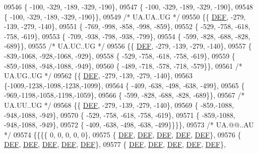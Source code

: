 \begin{DoxyCode}
09546 \{ -100, -329, -189, -329, -190\},
09547 \{ -100, -329, -189, -329, -190\},
09548 \{ -100, -329, -189, -329, -190\}\},
09549 \textcolor{comment}{/* UA.UA..UG */}
09550 \{\{  \mbox{\hyperlink{1_88_84__epars_8h_a397419fc12b37ed479c8abb9d444d843}{DEF}}, -279, -139, -279, -140\},
09551 \{ -769, -998, -858, -998, -859\},
09552 \{ -529, -758, -618, -758, -619\},
09553 \{ -709, -938, -798, -938, -799\},
09554 \{ -599, -828, -688, -828, -689\}\},
09555 \textcolor{comment}{/* UA.UC..UG */}
09556 \{\{  \mbox{\hyperlink{1_88_84__epars_8h_a397419fc12b37ed479c8abb9d444d843}{DEF}}, -279, -139, -279, -140\},
09557 \{ -839,-1068, -928,-1068, -929\},
09558 \{ -529, -758, -618, -758, -619\},
09559 \{ -859,-1088, -948,-1088, -949\},
09560 \{ -489, -718, -578, -718, -579\}\},
09561 \textcolor{comment}{/* UA.UG..UG */}
09562 \{\{  \mbox{\hyperlink{1_88_84__epars_8h_a397419fc12b37ed479c8abb9d444d843}{DEF}}, -279, -139, -279, -140\},
09563 \{-1009,-1238,-1098,-1238,-1099\},
09564 \{ -409, -638, -498, -638, -499\},
09565 \{ -969,-1198,-1058,-1198,-1059\},
09566 \{ -599, -828, -688, -828, -689\}\},
09567 \textcolor{comment}{/* UA.UU..UG */}
09568 \{\{  \mbox{\hyperlink{1_88_84__epars_8h_a397419fc12b37ed479c8abb9d444d843}{DEF}}, -279, -139, -279, -140\},
09569 \{ -859,-1088, -948,-1088, -949\},
09570 \{ -529, -758, -618, -758, -619\},
09571 \{ -859,-1088, -948,-1088, -949\},
09572 \{ -409, -638, -498, -638, -499\}\}\}\},
09573 \textcolor{comment}{/* UA.@@..AU */}
09574 \{\{\{\{    0,    0,    0,    0,    0\},
09575 \{  \mbox{\hyperlink{1_88_84__epars_8h_a397419fc12b37ed479c8abb9d444d843}{DEF}},  \mbox{\hyperlink{1_88_84__epars_8h_a397419fc12b37ed479c8abb9d444d843}{DEF}},  \mbox{\hyperlink{1_88_84__epars_8h_a397419fc12b37ed479c8abb9d444d843}{DEF}},  \mbox{\hyperlink{1_88_84__epars_8h_a397419fc12b37ed479c8abb9d444d843}{DEF}},  \mbox{\hyperlink{1_88_84__epars_8h_a397419fc12b37ed479c8abb9d444d843}{DEF}}\},
09576 \{  \mbox{\hyperlink{1_88_84__epars_8h_a397419fc12b37ed479c8abb9d444d843}{DEF}},  \mbox{\hyperlink{1_88_84__epars_8h_a397419fc12b37ed479c8abb9d444d843}{DEF}},  \mbox{\hyperlink{1_88_84__epars_8h_a397419fc12b37ed479c8abb9d444d843}{DEF}},  \mbox{\hyperlink{1_88_84__epars_8h_a397419fc12b37ed479c8abb9d444d843}{DEF}},  \mbox{\hyperlink{1_88_84__epars_8h_a397419fc12b37ed479c8abb9d444d843}{DEF}}\},
09577 \{  \mbox{\hyperlink{1_88_84__epars_8h_a397419fc12b37ed479c8abb9d444d843}{DEF}},  \mbox{\hyperlink{1_88_84__epars_8h_a397419fc12b37ed479c8abb9d444d843}{DEF}},  \mbox{\hyperlink{1_88_84__epars_8h_a397419fc12b37ed479c8abb9d444d843}{DEF}},  \mbox{\hyperlink{1_88_84__epars_8h_a397419fc12b37ed479c8abb9d444d843}{DEF}},  \mbox{\hyperlink{1_88_84__epars_8h_a397419fc12b37ed479c8abb9d444d843}{DEF}}\},

\end{DoxyCode}
